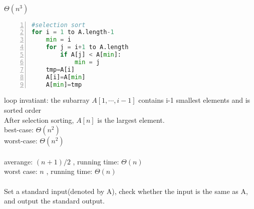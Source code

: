 \\
$ \Theta(n^3) $\\


\begin{lstlisting}[language=Python,numbers=left,numberstyle=\normalsize]
#selection sort
for i = 1 to A.length-1
    min = i
    for j = i+1 to A.length
        if A[j] < A[min]:
            min = j
    tmp=A[i]
    A[i]=A[min]
    A[min]=tmp
\end{lstlisting}
loop invatiant: the subarray $ A[1,\cdots,i-1] $ contains i-1 smallest elements and is sorted order\\
After selection sorting, $ A[n] $ is the largest element.\\
best-case: $ \Theta(n^2) $\\
worst-case: $ \Theta(n^2) $\\


\\
averange: $ (n+1) / 2 $ , running time: $ \Theta(n) $\\
worst case: $ n $ , running time: $ \Theta(n) $\\


\\
Set a standard input(denoted by A), check whether the input is the same as A, and output the standard output.
